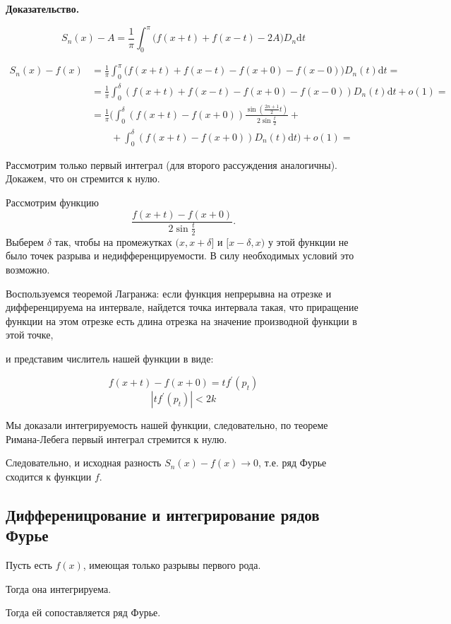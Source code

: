 \documentclass[12pt]{article}
\newcommand{\dd}{\ensuremath{\mathrm{d}}}
\begin{document}
  \textbf{Доказательство.}

  
  $$S_n(x) - A = \frac{1}{\pi} \int_{0}^{\pi} \big( f(x+t)+f(x-t) - 2A \big) D_n \dd t$$
  
  \begin{align*}
      S_n(x) - f(x) & = \frac{1}{\pi} \int_{0}^{\pi} \big( f(x+t)+f(x-t)-f(x+0)-f(x-0) \big) D_n(t) \dd t = \\
      & = \frac{1}{\pi} \int_{0}^{\delta} (f(x+t)+f(x-t)-f(x+0)-f(x-0))D_n(t) \dd t + o(1) = \\ 
      & = \frac{1}{\pi} \big( \int_{0}^{\delta} (f(x+t)-f(x+0))\frac{\sin(\frac{2n+1}{2}t)}{2\sin{\frac{t}{2}}} + \\
      & \qquad{} + \int_{0}^{\delta} \left( f(x+t) - f(x+0) \right) D_n(t) \dd t \big) + o(1) =
  \end{align*}
  
  Рассмотрим только первый интеграл (для второго рассуждения аналогичны). Докажем, что он стремится к нулю.

\newpage

  Рассмотрим функцию  $$ \frac{f(x+t)-f(x+0)}{2\sin{\frac{t}{2}}}.$$ Выберем $\delta$ так, 
  чтобы на промежутках $(x, x + \delta]$ и $[x - \delta, x)$ у этой функции не было точек разрыва и недифференцируемости.
  В силу необходимых условий это возможно.
 
Воспользуемся теоремой Лагранжа: если функция непрерывна на отрезке и дифференцируема на интервале, найдется точка интервала такая, 
что приращение функции на этом отрезке есть длина отрезка на значение производной функции в этой точке, 

и представим числитель нашей функции в виде:

$$ f(x+t)-f(x+0) = t f^\prime(p_t)$$ 
$$ |t f^\prime(p_t)| < 2k$$

Мы доказали интегрируемость нашей функции, следовательно, по теореме Римана-Лебега первый интеграл стремится к нулю.

Следовательно, и исходная разность $S_n(x) - f(x) \rightarrow 0$, т.е. ряд Фурье сходится к функции $f$. 

 \newpage
\subsection{Дифференицрование и интегрирование рядов Фурье}
  Пусть есть $f(x)$, имеющая только разрывы первого рода.
  
  Тогда она интегрируема.
  
  Тогда ей сопоставляется ряд Фурье.
  
\end{document}
